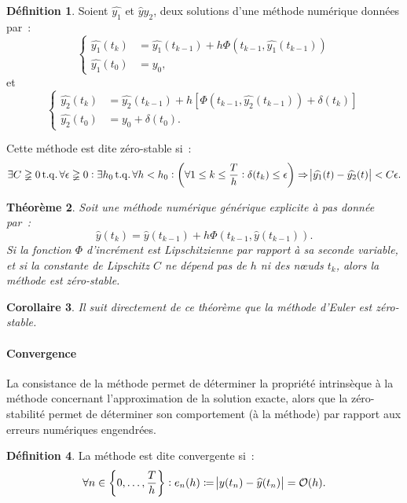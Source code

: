 \documentclass{article}
\newtheorem{thm}{Théorème}[section]
\newtheorem{cor}[thm]{Corollaire}
\theoremstyle{definition}
\newtheorem{déf}[thm]{Définition}
\theoremstyle{remark}
\DeclareMathOperator{\tq}{t.q.}  %
\begin{document}
		\begin{déf} Soient $\widehat {y_1}$ et $\widehat y{y_2}$, deux solutions d'une méthode numérique données par~:
		\[\begin{cases}\widehat {y_1}
			(t_k) &= \widehat {y_1}(t_{k-1}) + h\Phi(t_{k-1}, \widehat {y_1}(t_{k-1})) \\
			\widehat {y_1}(t_0) &= y_0,
		\end{cases}\]
		et
		\[\begin{cases}
			\widehat {y_2}(t_k) &= \widehat {y_2}(t_{k-1}) + h\left[\Phi(t_{k-1}, \widehat {y_2}(t_{k-1})) + \delta(t_k)\right] \\
			\widehat {y_2}(t_0) &= y_0 + \delta(t_0).
		\end{cases}\]

		Cette méthode est dite zéro-stable si~:
		\[\exists C \gneqq 0 \tq \forall \epsilon \gneqq 0 : \exists h_0 \tq \forall h < h_0 :
			\left(\forall 1 \leq k \leq \frac Th : \delta(t_k) \leq \epsilon\right) \Rightarrow \abs {\widehat {y_1}(t) - \widehat {y_2}(t)} < C\epsilon.\]
		\end{déf}

		\begin{thm} Soit une méthode numérique générique explicite à pas donnée par~:
		\[\widehat y(t_k) = \widehat y(t_{k-1}) + h\Phi(t_{k-1}, \widehat y(t_{k-1})).\]
		Si la fonction $\Phi$ d'incrément est Lipschitzienne par rapport à sa seconde variable, et si la constante de Lipschitz $C$ ne dépend pas de $h$ ni des
		nœuds $t_k$, alors la méthode est zéro-stable.
		\end{thm}

		\begin{cor} Il suit directement de ce théorème que la méthode d'Euler est zéro-stable. \end{cor}

		\paragraph{Convergence} La consistance de la méthode permet de déterminer la propriété intrinsèque à la méthode concernant l'approximation de la
		solution exacte, alors que la zéro-stabilité permet de déterminer son comportement (à la méthode) par rapport aux erreurs numériques engendrées.

		\begin{déf} La méthode est dite convergente si~:
		\[\forall n \in \left\{0, \dotsc, \frac Th\right\} : e_n(h) \coloneqq \abs{y(t_n) - \widehat y(t_n)} = \mathcal O(h).\]
		\end{déf}
\end{document}
